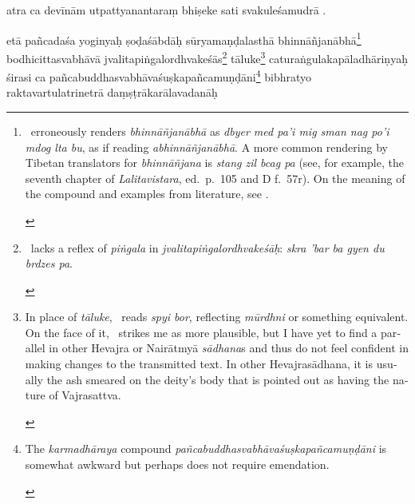 \documentclass[naipra.tex]{subfiles}
\begin{document}
\begin{sanskrit}
\pstart
atra ca devīnām utpattyanantaraṃ bhiṣeke sati svakuleśamudrā . 
\pend


\pstart
etā pañcadaśa yoginyaḥ ṣoḍaśābdāḥ sūryamaṇḍalasthā bhinnāñjanābhā\footnote{
	\begin{english}%
		\TIB\ erroneously renders \emph{bhinnāñjanābhā} as \emph{dbyer med pa'i mig sman nag po'i mdog lta bu}, as if reading \emph{abhinnāñjanābhā}.
		A more common rendering by Tibetan translators for \emph{bhinnāñjana} is \emph{stang zil bcag pa} (see, for example, the seventh chapter of \emph{Lalitavistara}, ed.\ p.\ 105 and D f.\ 57r).
		On the meaning of the compound and examples from literature, see \cite{vogel1968}.
	\end{english}
} bodhicittasvabhāvā jvalitapiṅgalordhvakeśās\footnote{
	\begin{english}%
		\TIB\ lacks a reflex of \emph{piṅgala} in \emph{jvalitapiṅgalordhvakeśāḥ}: \emph{skra 'bar ba gyen du brdzes pa}.
	\end{english}
} \crux tāluke\crux\footnote{
	\begin{english}%
		In place of \emph{tāluke}, \TIB\ reads \emph{spyi bor}, reflecting \emph{mūrdhni} or something equivalent.
		On the face of it, \TIB\ strikes me as more plausible, but I have yet to find a parallel in other Hevajra or Nairātmyā \emph{sādhana}s and thus do not feel confident in making changes to the transmitted text. 
		In other Hevajrasādhana, it is usually the ash smeared on the deity's body that is pointed out as having the nature of Vajrasattva.
	\end{english}
} caturaṅgulakapāladhāriṇyaḥ śirasi ca pañcabuddhasvabhāvaśuṣkapañcamuṇḍāni\footnote{
	\begin{english}%
		The \emph{karmadhāraya} compound \emph{pañcabuddhasvabhāvaśuṣkapañcamuṇḍāni} is somewhat awkward but perhaps does not require emendation.
	\end{english}
} bibhratyo raktavartulatrinetrā daṃṣṭrākarālavadanāḥ 
\end{sanskrit}
\end{document}
